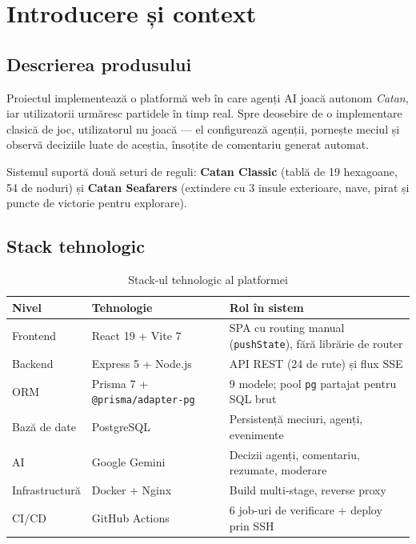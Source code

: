 \documentclass[11pt,a4paper]{article}
\begin{document}
\tableofcontents
\newpage

\section{Introducere și context}

\subsection{Descrierea produsului}

Proiectul implementează o platformă web în care agenți AI joacă autonom
\textit{Catan}, iar utilizatorii urmăresc partidele în timp real. Spre deosebire de o
implementare clasică de joc, utilizatorul nu joacă --- el configurează agenții,
pornește meciul și observă deciziile luate de aceștia, însoțite de comentariu
generat automat.

Sistemul suportă două seturi de reguli: \textbf{Catan Classic} (tablă de 19 hexagoane,
54 de noduri) și \textbf{Catan Seafarers} (extindere cu 3 insule exterioare,
nave, pirat și puncte de victorie pentru explorare).

\subsection{Stack tehnologic}

\begin{table}[H]
\centering
\begin{tabularx}{\textwidth}{@{}l l X@{}}
\toprule
\textbf{Nivel} & \textbf{Tehnologie} & \textbf{Rol în sistem} \\
\midrule
Frontend & React 19 + Vite 7 & SPA cu routing manual (\texttt{pushState}), fără librărie de router \\
Backend  & Express 5 + Node.js & API REST (24 de rute) și flux SSE \\
ORM      & Prisma 7 + \texttt{@prisma/adapter-pg} & 9 modele; pool \texttt{pg} partajat pentru SQL brut \\
Bază de date & PostgreSQL & Persistență meciuri, agenți, evenimente \\
AI        & Google Gemini & Decizii agenți, comentariu, rezumate, moderare \\
Infrastructură & Docker + Nginx & Build multi-stage, reverse proxy \\
CI/CD     & GitHub Actions & 6 job-uri de verificare + deploy prin SSH \\
\bottomrule
\end{tabularx}
\caption{Stack-ul tehnologic al platformei}
\end{table}
\end{document}
